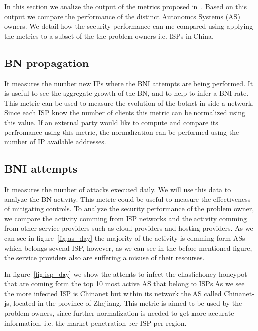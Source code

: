\label{cap:sec2}
In this section we analize the output of the metrics proposed in~\cite{owr_article}. Based on this output we compare the performance of the distinct Autonomos Systems (AS) owners. We detail how the security performance can me compared using applying the metrics to a subset of the the problem owners i.e. ISPs in China.



\subsection{BN propagation}
It measures the number new IPs where the BNI attempts are being performed. It is useful to see the aggregate growth of the BN, and to help to infer a BNI rate.
This metric can be used to measure the evolution of the botnet in side a network. Since each ISP know the number of clients this metric can be normalized using this value. If an external party would like to compute and compare its perfromance using this metric, the normalization can be performed using the number of IP available addresses.

\subsection{BNI attempts}
It measures the number of attacks executed daily. We will use this data to analyze the BN activity. This metric could be useful to measure the effectiveness of mitigating controls. To analyze the security performance of the problem owner, we compare the activity comming from ISP networks and the activity comming from other service providers such as cloud providers and hosting providers. As we can see in figure~\ref{fig:as_day} the majority of the activity is comming form ASs which belongs several ISP, however, as we can see in the before mentioned figure, the service providers also are suffering a misuse of their resourses.

In figure~\ref{fig:isp_day} we show the attemts to infect the ellastichoney honeypot that are coming form the top 10 most active AS that belong to ISPs.As we see the more infected ISP is Chinanet but within its network the AS called Chinanet-js, located in the province of Zhejiang. This metric is aimed to be used by the problem owners, since further normalization is needed to get more accurate information, i.e. the market penetration per ISP per region.



